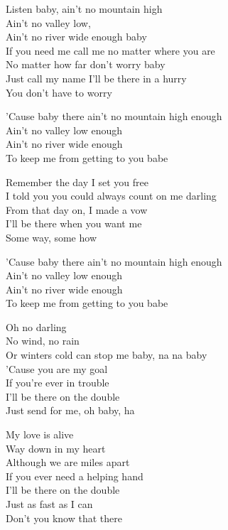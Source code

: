 \documentclass[11pt]{book}
\begin{document}
\settowidth{\versewidth}{Ain't no valley low, ain't no river wide enough baby}
\begin{canzone}%
Listen baby, ain't no mountain high\\
Ain't no valley low,\\
Ain't no river wide enough baby\\
If you need me call me no matter where you are\\
No matter how far don't worry baby\\
Just call my name I'll be there in a hurry\\
You don't have to worry

\begin{ritornello}
'Cause baby there ain't no mountain high enough\\
Ain't no valley low enough\\
Ain't no river wide enough\\
To keep me from getting to you babe
\end{ritornello}

Remember the day I set you free\\
I told you you could always count on me darling\\
From that day on, I made a vow\\
I'll be there when you want me\\
Some way, some how

\begin{ritornello}
'Cause baby there ain't no mountain high enough\\
Ain't no valley low enough\\
Ain't no river wide enough\\
To keep me from getting to you babe
\end{ritornello}

Oh no darling\\
No wind, no rain\\
Or winters cold can stop me baby, na na baby\\
'Cause you are my goal\\
If you're ever in trouble\\
I'll be there on the double\\
Just send for me, oh baby, ha

My love is alive\\
Way down in my heart\\
Although we are miles apart\\
If you ever need a helping hand\\
I'll be there on the double\\
Just as fast as I can\\
Don't you know that there


\end{canzone}
\end{document}
